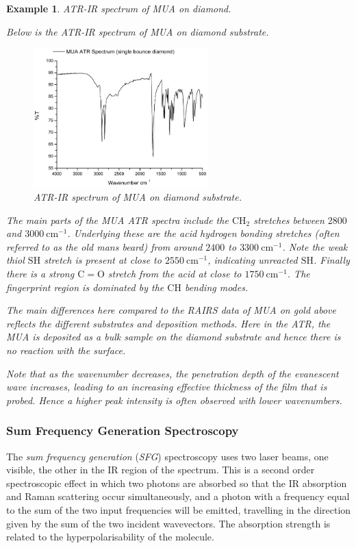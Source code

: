 \documentclass{article}
\theoremstyle{plain}\theoremheaderfont{\normalfont\itshape}\theorembodyfont{\rmfamily}\theoremseparator{.}\newtheorem*{rem}{Remark}\newtheorem*{ex}{Example}\newtheorem*{proof}{Proof}\newtheorem*{altp}{Alternative proof}
\theoremstyle{plain}\theoremheaderfont{\normalfont\bfseries}\theorembodyfont{\rmfamily}\theoremseparator{.}\newtheorem{thm}{Theorem}[section]\newtheorem{lem}[thm]{Lemma}\newtheorem{prop}[thm]{Proposition}\newtheorem*{cor}{Corollary}\newtheorem{defn}[thm]{Definition}\newtheorem{clm}[thm]{Claim}\newtheorem{clminproof}{Claim}\newtheorem*{law}{Law}\newtheorem{pos}[thm]{Postulate}
\theoremstyle{break}\theoremheaderfont{\normalfont\itshape}\theorembodyfont{\rmfamily}\theoremseparator{.\medskip}\newtheorem*{proofskip}{Proof}\newtheorem*{exs}{Examples}\newtheorem*{rems}{Remarks}
\theoremstyle{break}\theoremheaderfont{\normalfont\bfseries}\theorembodyfont{\rmfamily}\theoremseparator{.\medskip}\newtheorem{lemskip}[thm]{Lemma}\newtheorem{defnskip}[thm]{Definition}\newtheorem{propskip}[thm]{Proposition}\newtheorem{thmskip}[thm]{Theorem}
\numberwithin{equation}{section}
\newcommand{\unit}[1]{\ \mathrm{#1}}
\begin{document}
	\begin{ex}
		\textit{ATR-IR spectrum of MUA on diamond.}

		Below is the ATR-IR spectrum of MUA on diamond substrate.

		\begin{figure}[ht!]
			\centering
			\includegraphics[width=0.6\textwidth]{ATR_MUA.jpg}
			\caption{ATR-IR spectrum of MUA on diamond substrate.}
		\end{figure}

		The main parts of the MUA ATR spectra include the \(\mathrm{CH_2}\) stretches between \(2800\) and \(3000\unit{cm}^{-1}\). Underlying these are the acid hydrogen bonding stretches (often referred to as the old mans beard) from around \(2400\) to \(3300\unit{cm}^{-1}\). Note the weak thiol \(\mathrm{SH}\) stretch is present at close to \(2550\unit{cm}^{-1}\), indicating unreacted \(\mathrm{SH}\). Finally there is a strong \(\mathrm{C=O}\) stretch from the acid at close to \(1750\unit{cm}^{-1}\). The fingerprint region is dominated by the \(\mathrm{CH}\) bending modes.
		
		The main differences here compared to the RAIRS data of MUA on gold above reflects the different substrates and deposition methods. Here in the ATR, the MUA is deposited as a bulk sample on the diamond substrate and hence there is no reaction with the surface.
		
		Note that as the wavenumber decreases, the penetration depth of the evanescent wave increases, leading to an increasing effective thickness of the film that is probed. Hence a higher peak intensity is often observed with lower wavenumbers.
	\end{ex}

	\subsubsection{Sum Frequency Generation Spectroscopy}
	The \textit{sum frequency generation} (\textit{SFG}) spectroscopy uses two laser beams, one visible, the other in the IR region of the spectrum. This is a second order spectroscopic effect in which two photons are absorbed so that the IR absorption and Raman scattering occur simultaneously, and a photon with a frequency equal to the sum of the two input frequencies will be emitted, travelling in the direction given by the sum of the two incident wavevectors. The absorption strength is related to the hyperpolarisability of the molecule.
\end{document}

